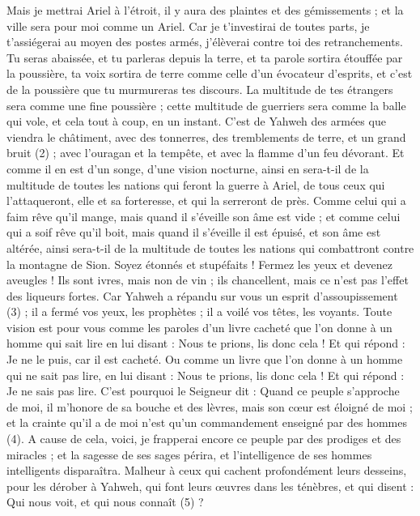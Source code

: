 \begin{multicols}{2}
{Mais je mettrai Ariel à l'étroit, il y aura des plaintes et des gémissements ; et la ville sera pour moi comme un Ariel.
Car je t’investirai de toutes parts, je t'assiégerai au moyen des postes armés, j’élèverai contre toi des retranchements.
Tu seras abaissée, et tu parleras depuis la terre, et ta parole sortira étouffée par la poussière, ta voix sortira de terre comme celle d’un évocateur d’esprits, et c’est de la poussière que tu murmureras tes discours.
La multitude de tes étrangers sera comme une fine poussière ; cette multitude de guerriers sera comme la balle qui vole, et cela tout à coup, en un instant.
C’est de Yahweh des armées que viendra le châtiment, avec des tonnerres, des tremblements de terre, et un grand bruit (2) ; avec l’ouragan et la tempête, et avec la flamme d’un feu dévorant.
Et comme il en est d’un songe, d’une vision nocturne, ainsi en sera-t-il de la multitude de toutes les nations qui feront la guerre à Ariel, de tous ceux qui l’attaqueront, elle et sa forteresse, et qui la serreront de près.
Comme celui qui a faim rêve qu'il mange, mais quand il s’éveille son âme est vide ; et comme celui qui a soif rêve qu'il boit, mais quand il s’éveille il est épuisé, et son âme est altérée, ainsi sera-t-il de la multitude de toutes les nations qui combattront contre la montagne de Sion.
Soyez étonnés et stupéfaits ! Fermez les yeux et devenez aveugles ! Ils sont ivres, mais non de vin ; ils chancellent, mais ce n’est pas l’effet des liqueurs fortes.
Car Yahweh a répandu sur vous un esprit d’assoupissement (3) ; il a fermé vos yeux, les prophètes ; il a voilé vos têtes, les voyants.
Toute vision est pour vous comme les paroles d'un livre cacheté que l’on donne à un homme qui sait lire en lui disant : Nous te prions, lis donc cela ! Et qui répond : Je ne le puis, car il est cacheté.
Ou comme un livre que l’on donne à un homme qui ne sait pas lire, en lui disant : Nous te prions, lis donc cela ! Et qui répond : Je ne sais pas lire.
C'est pourquoi le Seigneur dit : Quand ce peuple s'approche de moi, il m’honore de sa bouche et des lèvres, mais son cœur est éloigné de moi ; et la crainte qu’il a de moi n’est qu’un commandement enseigné par des hommes (4).
A cause de cela, voici, je frapperai encore ce peuple par des prodiges et des miracles ; et la sagesse de ses sages périra, et l'intelligence de ses hommes intelligents disparaîtra.
Malheur à ceux qui cachent profondément leurs desseins, pour les dérober à Yahweh, qui font leurs œuvres dans les ténèbres, et qui disent : Qui nous voit, et qui nous connaît (5) ?
}
\end{multicols}
